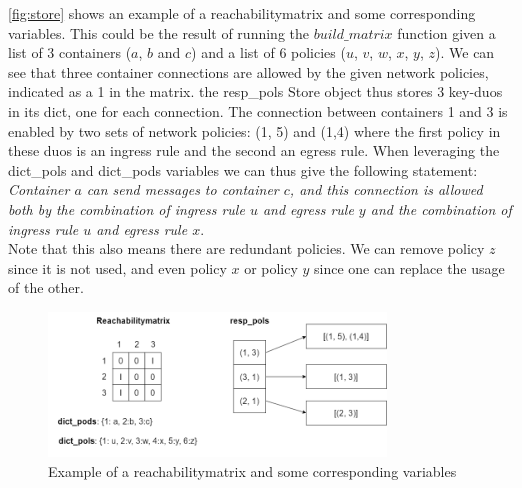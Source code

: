 \autoref{fig:store} shows an example of a reachabilitymatrix and some corresponding variables. This could be the result of running the  $build\_matrix$ function given a list of 3 containers ($a$, $b$ and $c$) and a list of 6 policies ($u$, $v$, $w$, $x$, $ y$, $z$). We can see that three container connections are allowed by the given network policies, indicated as a 1 in the matrix. the resp\_pols Store object thus stores 3 key-duos in its dict, one for each connection. The connection between containers 1 and 3 is enabled by two sets of network policies: (1, 5) and (1,4) where the first policy in these duos is an ingress rule and the second an egress rule. When leveraging the dict\_pols and dict\_pods variables we can thus give the following statement:
\\[10pt] 
\textit{Container $a$ can send messages to container $c$, and this connection is allowed both by the combination of ingress rule $u$ and egress rule $y$ and the combination of ingress rule $u$ and egress rule $x$}.
\\[10pt]
Note that this also means there are redundant policies. We can remove policy $z$ since it is not used, and even policy $x$ or policy $y$ since one can replace the usage of the other.
\begin{figure}[H]
  \centering
  \includegraphics[width=0.8\textwidth]{images/store.png}
  \caption{Example of a reachabilitymatrix and some corresponding variables}
  \label{fig:store}
\end{figure}


